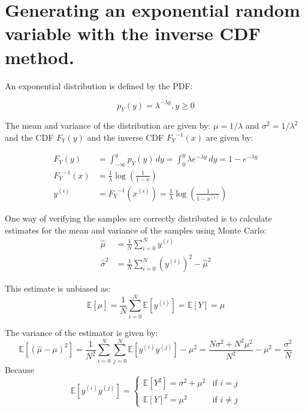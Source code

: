 \documentclass[12pt]{article}
\begin{document}
\section{Generating an exponential random variable with the inverse CDF method.}

An exponential distribution is defined by the PDF:

\begin{equation}
  p_Y(y)  = \lambda  ^ {- \lambda y}, y \ge 0	
\end{equation}

The mean and variance of the distribution are given by: $\mu = 1 / \lambda$ and $\sigma ^ 2 = 1 / \lambda ^ 2$ and the CDF $F_Y(y)$ and the inverse CDF ${F_Y}^{-1}(x)$ are given by:

\begin{align}
  F_Y (y) &= \int _ {- \infty} ^ y p_Y (y) \, dy =  \int _ 0 ^ y \lambda e ^ {- \lambda y} \, dy = 1 - e ^ {- \lambda y} \\
  {F_Y} ^ {-1} (x) &= \frac 1  \lambda \log {\left( \frac 1 {1 - x} \right)} \\
  y^{(i)} &= {F_Y} ^ {-1} (x ^ {(i)}) = \frac 1  \lambda  \log \left(\frac 1 {1 - x ^ {(i)}}  \right)
\end{align}

One way of verifying the samples are correctly distributed is to calculate estimates for the mean and variance of the samples using Monte Carlo:
\begin{align}
	\hat{\mu} &= \frac 1 N \sum ^ N _ {i=0} y^{(i)} \\
    \hat{\sigma}^2 &= \frac 1 N \sum ^ N _ {i=0} (y^{(i)})^2 - \hat \mu^2
\end{align}

This estimate is unbiased as:
\begin{equation}
	\mathbb{E}   [\hat{\mu}] = \frac 1 N \sum ^ N _ {i=0} \mathbb{E} [y^{(i)}] = \mathbb{E} [Y] = \mu
\end{equation}

The variance of the estimator is given by:
\begin{equation}
	\mathbb{E} [(\hat{\mu} - \mu)^2] =
    \frac 1 {N^2} \sum ^ N _ {i=0} \sum ^ N _ {j = 0} \mathbb{E} [y^{(i)}y^{(j)}] - \mu^2 =
   \frac {N\sigma^2 + N^2\mu^2} {N^2} - \mu^2 = 
   \frac {\sigma^2} N
\end{equation}
Because 
\begin{equation*}
  \mathbb{E} [y^{(i)}y^{(j)}]  = 
  \begin{cases} 
      \mathbb{E} [Y^2] = \sigma^2  +\mu^2 & \mbox{if } i = j \\
      \mathbb E [Y]^2 = \mu^2 & \mbox{if } i \ne j  	
  \end{cases}
\end{equation*}
\end{document}
